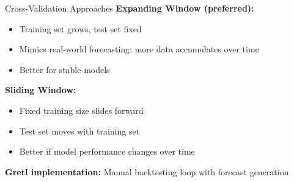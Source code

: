 \documentclass[11pt]{beamer}
\begin{document}
\begin{frame}[fragile]{Cross-Validation Approaches}
	\textbf{Expanding Window (preferred):}
	\begin{itemize}
		\item Training set grows, test set fixed
		\item Mimics real-world forecasting: more data accumulates over time
		\item Better for stable models
	\end{itemize}

	\vspace{0.5cm}
	\textbf{Sliding Window:}
	\begin{itemize}
		\item Fixed training size slides forward
		\item Test set moves with training set
		\item Better if model performance changes over time
	\end{itemize}

	\vspace{0.5cm}
	\textbf{Gretl implementation:} Manual backtesting loop with forecast generation
\end{frame}
\end{document}
